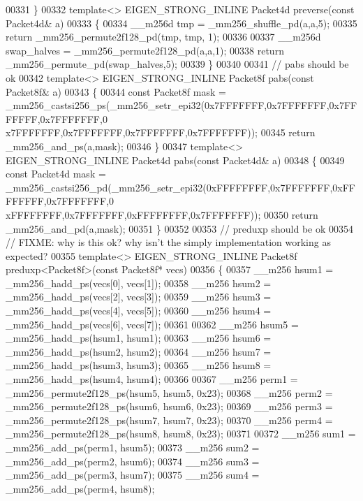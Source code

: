 \begin{DoxyCode}
{{00331 \}
00332 \textcolor{keyword}{template}<> EIGEN\_STRONG\_INLINE Packet4d preverse(\textcolor{keyword}{const} Packet4d& a)
00333 \{
00334    \_\_m256d tmp = \_mm256\_shuffle\_pd(a,a,5);
00335   \textcolor{keywordflow}{return} \_mm256\_permute2f128\_pd(tmp, tmp, 1);
00336 
00337   \_\_m256d swap\_halves = \_mm256\_permute2f128\_pd(a,a,1);
00338     \textcolor{keywordflow}{return} \_mm256\_permute\_pd(swap\_halves,5);
00339 \}
00340 
00341 \textcolor{comment}{// pabs should be ok}
00342 \textcolor{keyword}{template}<> EIGEN\_STRONG\_INLINE Packet8f pabs(\textcolor{keyword}{const} Packet8f& a)
00343 \{
00344   \textcolor{keyword}{const} Packet8f mask = \_mm256\_castsi256\_ps(\_mm256\_setr\_epi32(0x7FFFFFFF,0x7FFFFFFF,0x7FFFFFFF,0x7FFFFFFF,0
      x7FFFFFFF,0x7FFFFFFF,0x7FFFFFFF,0x7FFFFFFF));
00345   \textcolor{keywordflow}{return} \_mm256\_and\_ps(a,mask);
00346 \}
00347 \textcolor{keyword}{template}<> EIGEN\_STRONG\_INLINE Packet4d pabs(\textcolor{keyword}{const} Packet4d& a)
00348 \{
00349   \textcolor{keyword}{const} Packet4d mask = \_mm256\_castsi256\_pd(\_mm256\_setr\_epi32(0xFFFFFFFF,0x7FFFFFFF,0xFFFFFFFF,0x7FFFFFFF,0
      xFFFFFFFF,0x7FFFFFFF,0xFFFFFFFF,0x7FFFFFFF));
00350   \textcolor{keywordflow}{return} \_mm256\_and\_pd(a,mask);
00351 \}
00352 
00353 \textcolor{comment}{// preduxp should be ok}
00354 \textcolor{comment}{// FIXME: why is this ok? why isn't the simply implementation working as expected?}
00355 \textcolor{keyword}{template}<> EIGEN\_STRONG\_INLINE Packet8f preduxp<Packet8f>(\textcolor{keyword}{const} Packet8f* vecs)
00356 \{
00357     \_\_m256 hsum1 = \_mm256\_hadd\_ps(vecs[0], vecs[1]);
00358     \_\_m256 hsum2 = \_mm256\_hadd\_ps(vecs[2], vecs[3]);
00359     \_\_m256 hsum3 = \_mm256\_hadd\_ps(vecs[4], vecs[5]);
00360     \_\_m256 hsum4 = \_mm256\_hadd\_ps(vecs[6], vecs[7]);
00361 
00362     \_\_m256 hsum5 = \_mm256\_hadd\_ps(hsum1, hsum1);
00363     \_\_m256 hsum6 = \_mm256\_hadd\_ps(hsum2, hsum2);
00364     \_\_m256 hsum7 = \_mm256\_hadd\_ps(hsum3, hsum3);
00365     \_\_m256 hsum8 = \_mm256\_hadd\_ps(hsum4, hsum4);
00366 
00367     \_\_m256 perm1 =  \_mm256\_permute2f128\_ps(hsum5, hsum5, 0x23);
00368     \_\_m256 perm2 =  \_mm256\_permute2f128\_ps(hsum6, hsum6, 0x23);
00369     \_\_m256 perm3 =  \_mm256\_permute2f128\_ps(hsum7, hsum7, 0x23);
00370     \_\_m256 perm4 =  \_mm256\_permute2f128\_ps(hsum8, hsum8, 0x23);
00371 
00372     \_\_m256 sum1 = \_mm256\_add\_ps(perm1, hsum5);
00373     \_\_m256 sum2 = \_mm256\_add\_ps(perm2, hsum6);
00374     \_\_m256 sum3 = \_mm256\_add\_ps(perm3, hsum7);
00375     \_\_m256 sum4 = \_mm256\_add\_ps(perm4, hsum8);
}}
\end{DoxyCode}
